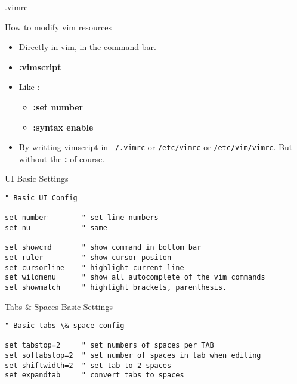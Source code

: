 \documentclass{beamer}
\begin{document}
\begin{frame}{.vimrc}
  \begin{block}{How to modify vim resources}
    \begin{itemize}
      \item Directly in vim, in the command bar.\\
      \item \textbf{:vimscript}\\
      \item Like :
             \begin{itemize}
              \item \textbf{:set number}
              \item \textbf{:syntax enable}
            \end{itemize}
          \item By writting vimscript in \texttt{~/.vimrc} or \texttt{/etc/vimrc} or \texttt{/etc/vim/vimrc}. But without the \textbf{:} of course.
    \end{itemize}
  \end{block}
\end{frame}

\begin{frame}[fragile]
  \begin{block}{UI Basic Settings}
\begin{verbatim}
" Basic UI Config

set number        " set line numbers
set nu            " same

set showcmd       " show command in bottom bar
set ruler         " show cursor positon
set cursorline    " highlight current line
set wildmenu      " show all autocomplete of the vim commands
set showmatch     " highlight brackets, parenthesis.
\end{verbatim}
  \end{block}
\end{frame}

\begin{frame}[fragile]
  \begin{block}{Tabs \& Spaces Basic Settings}
\begin{verbatim}
" Basic tabs \& space config

set tabstop=2     " set numbers of spaces per TAB
set softabstop=2  " set number of spaces in tab when editing
set shiftwidth=2  " set tab to 2 spaces
set expandtab     " convert tabs to spaces
\end{verbatim}
  \end{block}
\end{frame}
\end{document}
